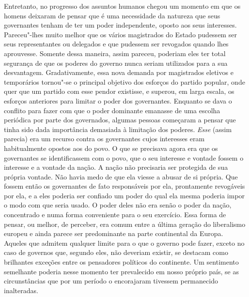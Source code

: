 Entretanto, no progresso dos assuntos humanos chegou um momento em que
os homens deixaram de pensar que é uma necessidade da natureza que seus
governantes tenham de ter um poder independente, oposto aos seus
interesses. Pareceu"-lhes muito melhor que os vários magistrados do
Estado pudessem ser seus representantes ou delegados e que pudessem ser
revogados quando lhes aprouvesse. Somente dessa maneira, assim pareceu,
poderiam eles ter total segurança de que os poderes do governo nunca
seriam utilizados para a sua desvantagem. Gradativamente, essa nova
demanda por magistrados eletivos e temporários tornou"-se o principal objetivo dos esforços do partido
popular, onde quer que um partido com esse pendor existisse, e superou, em
larga escala, os esforços anteriores para limitar o poder dos
governantes. Enquanto se dava o conflito para fazer com que o
poder dominante emanasse de uma escolha periódica por parte dos
governados, algumas pessoas começaram a pensar que  tinha sido dada importância
demasiada à limitação dos poderes.\textit{ Esse} (assim
parecia) era um recurso contra os governantes cujos interesses eram
habitualmente opostos aos do povo. O que se precisava agora era que os
governantes se identificassem com o povo, que o seu interesse e vontade
fossem o interesse e a vontade da nação. A nação não precisaria ser
protegida de sua própria vontade. Não havia medo de que ela viesse a
abusar de si própria. Que fossem então os governantes de fato
responsáveis por ela, prontamente revogáveis por ela, e a eles poderia ser
confiado um poder do qual ela mesma poderia impor o modo com que seria usado. O poder deles não
era senão o poder da nação, concentrado e numa forma conveniente para
o seu exercício. Essa forma de pensar, ou melhor, de perceber, era comum
entre a última geração do liberalismo europeu 
e ainda parece ser predominante na parte continental da Europa. 
Aqueles que admitem qualquer limite para o que o governo pode fazer, 
exceto no caso de governos que, segundo eles, não deveriam existir, se destacam
como brilhantes exceções entre os pensadores políticos do continente.
Um sentimento semelhante poderia nesse momento ter prevalecido em 
nosso próprio país, se as circunstâncias que
por um período o encorajaram tivessem permanecido inalteradas.

